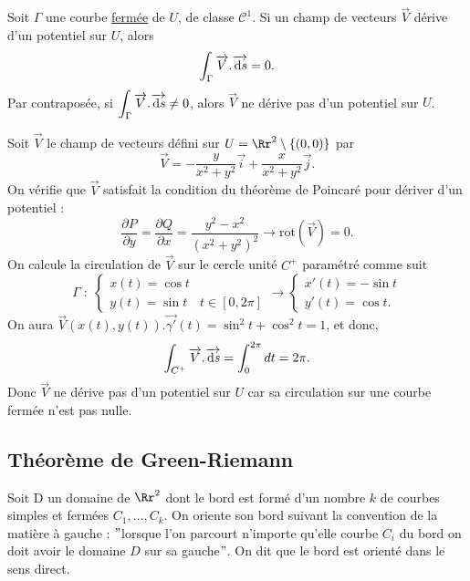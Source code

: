 \documentclass[class=report,crop=false]{standalone}
\begin{document}
\vskip6mm

\begin{corollaire} Soit $\Gamma$ une courbe \underline{fermée} de $U$, de classe ${\mathscr C}^1$. Si un champ de vecteurs $\overrightarrow{V}$ dérive d'un potentiel sur $U$, alors 
$$\displaystyle \int _{\Gamma}\overrightarrow{V}.\overrightarrow{\,\mathrm{d} s}=0.$$
Par contraposée, si $\displaystyle \int _{\Gamma}\overrightarrow{V}.\overrightarrow{\,\mathrm{d} s}\neq 0$, alors $\overrightarrow{V}$ ne dérive pas d'un potentiel sur $U$.
\end{corollaire}

\vskip4mm

Soit $\overrightarrow{V}$ le champ de vecteurs défini sur $U=\Rr^2\setminus \{(0,0)\}$ par
$$\overrightarrow{V}=-\frac{y}{x^2+y^2}\vec i+\frac{x}{x^2+y^2}\vec j.$$
On vérifie que $\overrightarrow{V}$ satisfait la condition du théorème de Poincaré pour dériver d'un potentiel :
$$\frac{\partial P}{\partial y}=\frac{\partial Q}{\partial x}=\frac{y^2-x^2}{(x^2+y^2)^2}\rightarrow \mbox{rot}\left(\overrightarrow{V}\right)=0.$$
On calcule la circulation de $\overrightarrow{V}$ sur le cercle unité $C^+$ paramétré comme suit 
$$\Gamma \; :\; \left\{\begin{array}{ll}x(t)=\cos t &\\ y(t)=\sin t&t\in [0,2\pi]\end{array}\right. \rightarrow \left\{\begin{array}{l}x'(t)=-\sin t \\ y'(t)=\cos t.\end{array}\right.$$
On aura $\overrightarrow{V}(x(t),y(t)).\overrightarrow{\gamma '}(t)=\sin ^2t+\cos ^2t=1$, et donc,
$$\displaystyle \int _{C^+}\overrightarrow{V}.\overrightarrow{\,\mathrm{d} s}=\int _0^{2\pi}dt=2\pi .$$
Donc $\overrightarrow{V}$ ne dérive pas d'un potentiel sur $U$ car sa circulation sur une courbe fermée n'est pas nulle.

\vskip8mm

\subsection{Théorème de Green-Riemann}

\vskip4mm

Soit D un domaine de $\Rr^2$ dont le bord est formé d'un nombre $k$ de courbes simples et fermées $C_1,\dots ,C_k$. On oriente son bord suivant la convention de la matière à gauche : $"$lorsque l'on parcourt n'importe qu'elle courbe $C_i$ du bord on doit avoir le domaine $D$ sur sa gauche$"$. On dit que le bord est orienté dans le sens direct.
\end{document}
